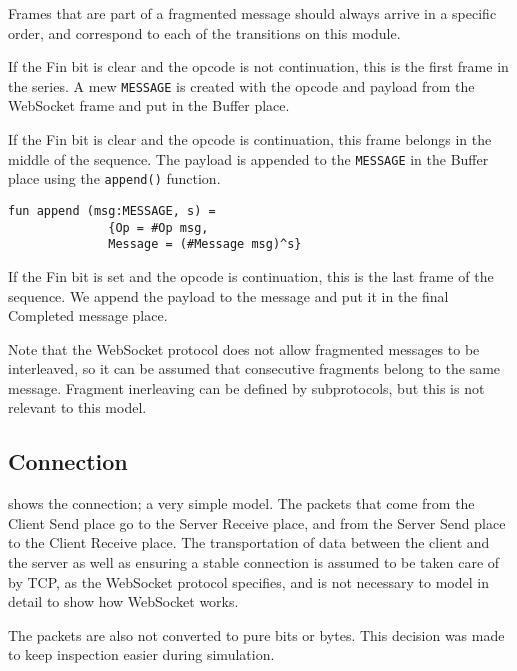 			
			Frames that are part of a fragmented message should always arrive in a
			specific order, and correspond to each of the transitions on this module. 
			
			If the Fin bit is clear and the opcode is not continuation, this is the first
			frame in the series. A mew \lstinline:MESSAGE: is created with the opcode and
			payload from the WebSocket frame and put in the Buffer place.
			
			If the Fin bit is clear and the opcode is continuation, this frame belongs in
			the middle of the sequence. The payload is appended to the
			\lstinline:MESSAGE: in the Buffer place using the \lstinline:append():
			function.
			
			\begin{lstlisting}[label=lst:append,caption=append,gobble=3]
			fun append (msg:MESSAGE, s) = 
			  {Op = #Op msg,
			  Message = (#Message msg)^s}
			\end{lstlisting}
			
			If the Fin bit is set and the opcode is continuation, this is the last frame
			of the sequence. We append the payload to the message and put it in the final
			Completed message place. 
			
			Note that the WebSocket protocol does not allow fragmented messages to be
			interleaved, so it can be assumed that consecutive fragments belong to the
			same message. Fragment inerleaving can be defined by subprotocols, but this
			is not relevant to this model.
			
\subsection{Connection}

	
	 shows the connection; a very simple model. The packets that
	come from the Client Send place go to the Server Receive place, and from the
	Server Send place to the Client Receive place. The transportation of data
	between the client and the server as well as ensuring a stable connection is
	assumed to be taken care of by TCP, as the WebSocket protocol specifies, and
	is not necessary to model in detail to show how WebSocket works. 
	
	The packets are also not converted to pure bits or bytes. This decision was
	made to keep inspection easier during simulation. 

